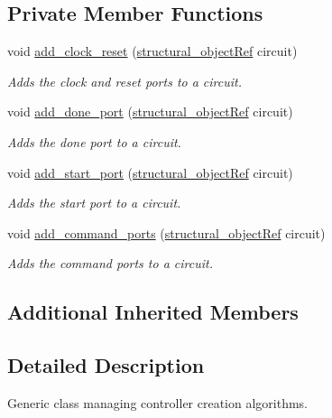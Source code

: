 \subsection*{Private Member Functions}
\begin{DoxyCompactItemize}
\item 
void \hyperlink{classControllerCreatorBaseStep_af4f27f2275640d4ff0ab51374597b0ad}{add\+\_\+clock\+\_\+reset} (\hyperlink{structural__objects_8hpp_a8ea5f8cc50ab8f4c31e2751074ff60b2}{structural\+\_\+object\+Ref} circuit)
\begin{DoxyCompactList}\small\item\em Adds the clock and reset ports to a circuit. \end{DoxyCompactList}\item 
void \hyperlink{classControllerCreatorBaseStep_a541e663f888f8a3af8d382fb71c929c1}{add\+\_\+done\+\_\+port} (\hyperlink{structural__objects_8hpp_a8ea5f8cc50ab8f4c31e2751074ff60b2}{structural\+\_\+object\+Ref} circuit)
\begin{DoxyCompactList}\small\item\em Adds the done port to a circuit. \end{DoxyCompactList}\item 
void \hyperlink{classControllerCreatorBaseStep_a7ed45c9688186b9d940d8eb50fead293}{add\+\_\+start\+\_\+port} (\hyperlink{structural__objects_8hpp_a8ea5f8cc50ab8f4c31e2751074ff60b2}{structural\+\_\+object\+Ref} circuit)
\begin{DoxyCompactList}\small\item\em Adds the start port to a circuit. \end{DoxyCompactList}\item 
void \hyperlink{classControllerCreatorBaseStep_a86b0917636dd8df88f42bb933e448bb9}{add\+\_\+command\+\_\+ports} (\hyperlink{structural__objects_8hpp_a8ea5f8cc50ab8f4c31e2751074ff60b2}{structural\+\_\+object\+Ref} circuit)
\begin{DoxyCompactList}\small\item\em Adds the command ports to a circuit. \end{DoxyCompactList}\end{DoxyCompactItemize}
\subsection*{Additional Inherited Members}


\subsection{Detailed Description}
Generic class managing controller creation algorithms. 

